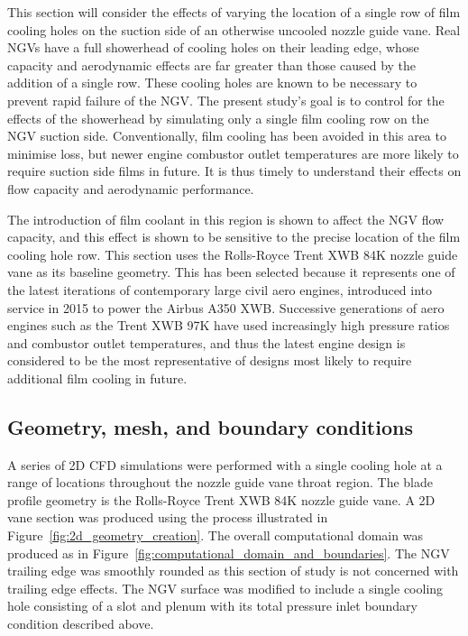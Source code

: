 \documentclass[a4paper, 11pt, oneside]{report}
\begin{document}
This section will consider the effects of varying the location of a single row of film cooling holes on the suction side of an otherwise uncooled nozzle guide vane. Real NGVs have a full showerhead of cooling holes on their leading edge, whose capacity and aerodynamic effects are far greater than those caused by the addition of a single row. These cooling holes are known to be necessary to prevent rapid failure of the NGV. The present study's goal is to control for the effects of the showerhead by simulating only a single film cooling row on the NGV suction side. Conventionally, film cooling has been avoided in this area to minimise loss, but newer engine combustor outlet temperatures are more likely to require suction side films in future. It is thus timely to understand their effects on flow capacity and aerodynamic performance. 

The introduction of film coolant in this region is shown to affect the NGV flow capacity, and this effect is shown to be sensitive to the precise location of the film cooling hole row. This section uses the Rolls-Royce Trent XWB 84K nozzle guide vane as its baseline geometry. This has been selected because it represents one of the latest iterations of contemporary large civil aero engines, introduced into service in 2015 to power the Airbus A350 XWB. Successive generations of aero engines such as the Trent XWB 97K have used increasingly high pressure ratios and combustor outlet temperatures, and thus the latest engine design is considered to be the most representative of designs most likely to require additional film cooling in future.

\subsection{Geometry, mesh, and boundary conditions}

A series of 2D CFD simulations were performed with a single cooling hole at a range of locations throughout the nozzle guide vane throat region. The blade profile geometry is the Rolls-Royce Trent XWB 84K nozzle guide vane. A 2D vane section was produced using the process illustrated in Figure~\ref{fig:2d_geometry_creation}. The overall computational domain was produced as in Figure~\ref{fig:computational_domain_and_boundaries}. The NGV trailing edge was smoothly rounded as this section of study is not concerned with trailing edge effects. The NGV surface was modified to include a single cooling hole consisting of a slot and plenum with its total pressure inlet boundary condition described above. 
\end{document}

